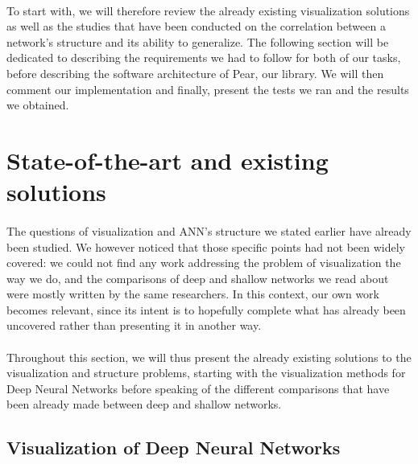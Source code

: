 \documentclass[a4paper]{article}
\begin{document}
\paragraph{}To start with, we will therefore review the already existing visualization solutions as well as the studies that have been conducted on the correlation between a network's structure and its ability to generalize. The following section will be dedicated to describing the requirements we had to follow for both of our tasks, before describing the software architecture of Pear, our library. We will then comment our implementation and finally, present the tests we ran and the results we obtained.




\section{State-of-the-art and existing solutions}

\paragraph{}The questions of visualization and ANN's structure we stated earlier have already been studied. We however noticed that those specific points had not been widely covered: we could not find any work addressing the problem of visualization the way we do, and the comparisons of deep and shallow networks we read about were mostly written by the same researchers. In this context, our own work becomes relevant, since its intent is to hopefully complete what has already been uncovered rather than presenting it in another way.

\paragraph{}Throughout this section, we will thus present the already existing solutions to the visualization and structure problems, starting with the visualization methods for Deep Neural Networks before speaking of the different comparisons that have been already made between deep and shallow networks.  


\subsection{Visualization of Deep Neural Networks}
\end{document}

